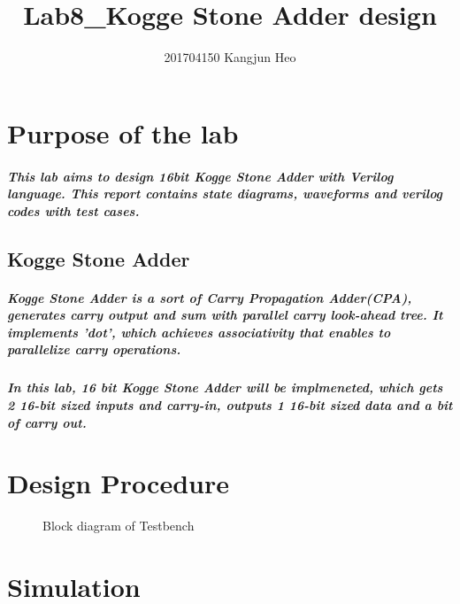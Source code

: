 \documentclass[a4paper]{report}
\title{Lab8\_Kogge Stone Adder design}
\author{201704150 Kangjun Heo}
\begin{document}
    \maketitle
    \tableofcontents

    \chapter{Purpose of the lab}

        \paragraph{This lab aims to design 16bit Kogge Stone Adder with Verilog language. This report contains state diagrams, waveforms and verilog codes with test cases.}
    
        \section{Kogge Stone Adder}

        \paragraph{\normalfont Kogge Stone Adder is a sort of Carry Propagation Adder(CPA), generates carry output and sum with parallel carry look-ahead tree. It implements 'dot', which achieves associativity that enables to parallelize carry operations.}

        \paragraph{\normalfont In this lab, 16 bit Kogge Stone Adder will be implmeneted, which gets 2 16-bit sized inputs and carry-in, outputs 1 16-bit sized data and a bit of carry out.}
        

    \chapter{Design Procedure}
        \begin{figure}[!htb]
            \centering
            \caption {Block diagram of Testbench}
            \label{fig:wf-0}
        \end{figure}
        

    \chapter{Simulation}
\end{document}
